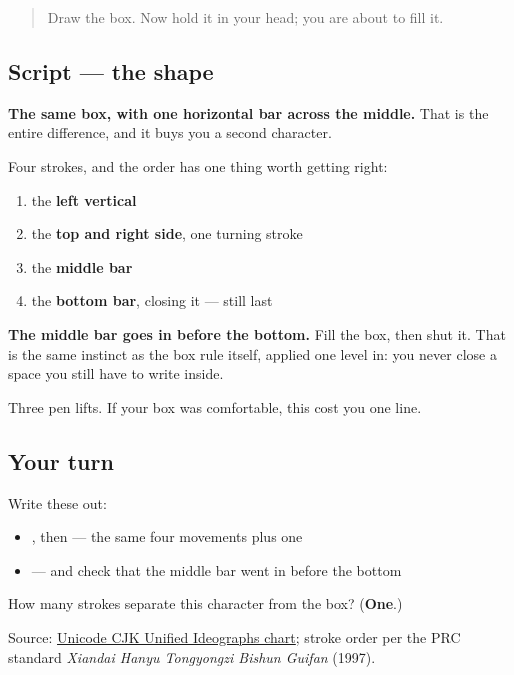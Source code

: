 \label{lesson:ZH-W04-ri}



\begin{quote}
Draw the box. Now hold it in your head; you are about to fill it.
\end{quote}

\subsection*{Script — the shape}

\begin{quote}
\end{quote}

\textbf{The same box, with one horizontal bar across the middle.} That is the entire difference, and it buys you a second character.

Four strokes, and the order has one thing worth getting right:

\begin{enumerate}
\raggedright
  \item the \textbf{left vertical}
  \item the \textbf{top and right side}, one turning stroke
  \item the \textbf{middle bar}
  \item the \textbf{bottom bar}, closing it — still last
\end{enumerate}

\textbf{The middle bar goes in before the bottom.} Fill the box, then shut it. That is the same instinct as the box rule itself, applied one level in: you never close a space you still have to write inside.

Three pen lifts. If your box was comfortable, this cost you one line.

\subsection*{Your turn}
Write these out:

\begin{itemize}
\raggedright
  \item {}, then  — the same four movements plus one
  \item {} — and check that the middle bar went in before the bottom
\end{itemize}

\begin{tcolorbox}[breakable,colback=teal!4,colframe=teal!35!black,title={Before you move on}]
How many strokes separate this character from the box? (\textbf{One}.)

Source: \href{https://www.unicode.org/charts/PDF/U4E00.pdf}{Unicode CJK Unified Ideographs chart}; stroke order per the PRC standard \emph{Xiandai Hanyu Tongyongzi Bishun Guifan} (1997).
\end{tcolorbox}
